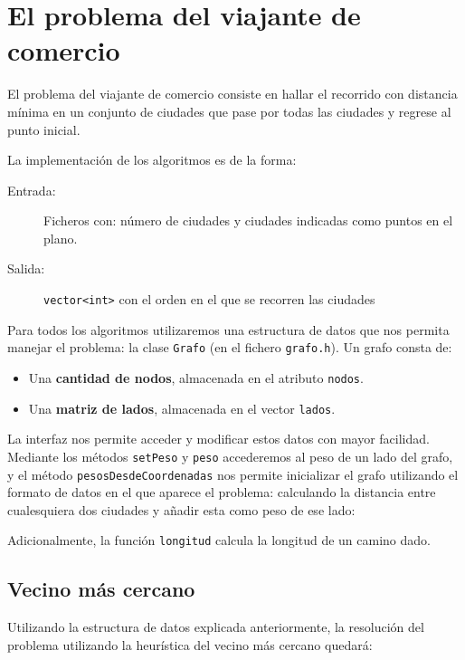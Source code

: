 \section{El problema del viajante de comercio}

El problema del viajante de comercio consiste en hallar el recorrido con distancia
mínima en un conjunto de ciudades que pase por todas las ciudades y regrese al punto
inicial.

La implementación de los algoritmos es de la forma:
\begin{description}
 \item[Entrada:] Ficheros con: número de ciudades y
 ciudades indicadas como puntos en el plano.
 \item[Salida:] \texttt{vector<int>} con el orden en el que se recorren las ciudades
\end{description}

Para todos los algoritmos utilizaremos una estructura de datos que nos permita manejar
el problema: la clase \texttt{Grafo} (en el fichero \texttt{grafo.h}). Un grafo consta
de:

\begin{itemize}
  \item Una \textbf{cantidad de nodos}, almacenada en el atributo \texttt{nodos}.
  \item Una \textbf{matriz de lados}, almacenada en el vector \texttt{lados}.
\end{itemize}

La interfaz nos permite acceder y modificar estos datos con mayor facilidad.
Mediante los métodos \texttt{setPeso} y \texttt{peso} accederemos al peso de un
lado del grafo, y el método \texttt{pesosDesdeCoordenadas} nos permite inicializar el
grafo utilizando el formato de datos en el que aparece el problema: calculando
la distancia entre cualesquiera dos ciudades y añadir esta como peso de ese lado:



Adicionalmente, la función \texttt{longitud} calcula la longitud de un camino dado.


\subsection{Vecino más cercano}

Utilizando la estructura de datos explicada anteriormente, la resolución del problema
utilizando la heurística del vecino más cercano quedará:

